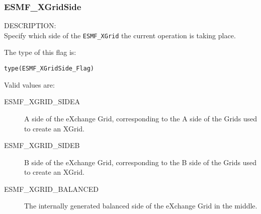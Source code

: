 
\subsubsection{ESMF\_XGridSide}
\label{opt:xgridoptions}

{\sf DESCRIPTION:\\}  
Specify which side of the {\tt ESMF\_XGrid} the current operation is taking place.

The type of this flag is:

{\tt type(ESMF\_XGridSide\_Flag)}

Valid values are:
\begin{description}
\item [ESMF\_XGRID\_SIDEA]
  A side of the eXchange Grid, corresponding to the A side of the Grids used to create an XGrid.
\item [ESMF\_XGRID\_SIDEB]
  B side of the eXchange Grid, corresponding to the B side of the Grids used to create an XGrid.
\item [ESMF\_XGRID\_BALANCED]
  The internally generated balanced side of the eXchange Grid in the middle.
\end{description}

